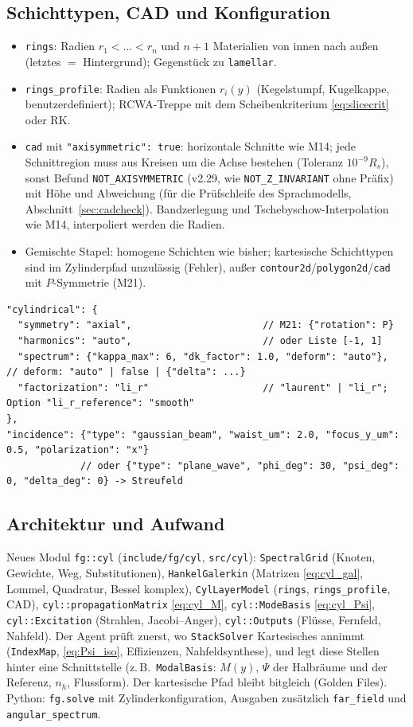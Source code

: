 \subsection{Schichttypen, CAD und Konfiguration}
\begin{itemize}[nosep]
  \item \verb|rings|: Radien $r_1<\dots<r_n$ und $n+1$ Materialien von innen nach außen (letztes $=$ Hintergrund);
        Gegenstück zu \verb|lamellar|.
  \item \verb|rings_profile|: Radien als Funktionen $r_i(y)$ (Kegelstumpf, Kugelkappe, benutzerdefiniert); RCWA-Treppe
        mit dem Scheibenkriterium \eqref{eq:slicecrit} oder RK.
  \item \verb|cad| mit \verb|"axisymmetric": true|: horizontale Schnitte wie M14; jede Schnittregion muss aus Kreisen um
        die Achse bestehen (Toleranz $10^{-9}R_s$), sonst Befund \verb|NOT_AXISYMMETRIC| (v2.29, wie \verb|NOT_Z_INVARIANT| ohne Präfix) mit Höhe und Abweichung
        (für die Prüfschleife des Sprachmodells, Abschnitt~\ref{sec:cadcheck}). Bandzerlegung und
        Tschebyschow-Interpolation wie M14, interpoliert werden die Radien.
  \item Gemischte Stapel: homogene Schichten wie bisher; kartesische Schichttypen sind im Zylinderpfad unzulässig
        (Fehler), außer \verb|contour2d|/\verb|polygon2d|/\verb|cad| mit $P$-Symmetrie (M21).
\end{itemize}
{\footnotesize\begin{verbatim}
"cylindrical": {
  "symmetry": "axial",                       // M21: {"rotation": P}
  "harmonics": "auto",                       // oder Liste [-1, 1]
  "spectrum": {"kappa_max": 6, "dk_factor": 1.0, "deform": "auto"},  // deform: "auto" | false | {"delta": ...}
  "factorization": "li_r"                    // "laurent" | "li_r"; Option "li_r_reference": "smooth"
},
"incidence": {"type": "gaussian_beam", "waist_um": 2.0, "focus_y_um": 0.5, "polarization": "x"}
             // oder {"type": "plane_wave", "phi_deg": 30, "psi_deg": 0, "delta_deg": 0} -> Streufeld
\end{verbatim}}

\subsection{Architektur und Aufwand}
Neues Modul \verb|fg::cyl| (\verb|include/fg/cyl|, \verb|src/cyl|): \verb|SpectralGrid| (Knoten, Gewichte, Weg,
Substitutionen), \verb|HankelGalerkin| (Matrizen \eqref{eq:cyl_gal}, Lommel, Quadratur, Bessel komplex),
\verb|CylLayerModel| (\verb|rings|, \verb|rings_profile|, CAD), \verb|cyl::propagationMatrix| \eqref{eq:cyl_M},
\verb|cyl::ModeBasis| \eqref{eq:cyl_Psi}, \verb|cyl::Excitation| (Strahlen, Jacobi--Anger), \verb|cyl::Outputs|
(Flüsse, Fernfeld, Nahfeld). Der Agent prüft zuerst, wo \verb|StackSolver| Kartesisches annimmt (\verb|IndexMap|,
\eqref{eq:Psi_iso}, Effizienzen, Nahfeldsynthese), und legt diese Stellen hinter eine Schnittstelle (z.\,B.\
\verb|ModalBasis|: $M(y)$, $\Psi$ der Halbräume und der Referenz, $n_h$, Flussform). Der kartesische Pfad bleibt
bitgleich (Golden Files). Python: \verb|fg.solve| mit Zylinderkonfiguration, Ausgaben zusätzlich
\verb|far_field| und \verb|angular_spectrum|.

